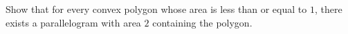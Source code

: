 Show that for every convex polygon whose area is less than or equal to $1$,  there exists a parallelogram with area $2$ containing the polygon.